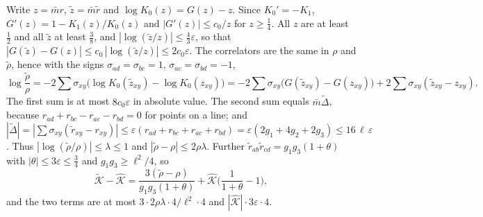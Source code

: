 \documentclass[11pt,a4paper]{article}
\makeatletter
\theoremstyle{stmt}
\theoremstyle{defn}
\theoremstyle{rmk}
\renewenvironment{proof}[1][\proofname]{\par\pushQED{\qed}\normalfont\topsep6\p@\@plus6\p@\relax
  \trivlist\item[\hskip\labelsep{\sffamily\itshape\small #1.}]\ignorespaces}{\popQED\endtrivlist\@endpefalse}
\numberwithin{equation}{section}
\makeatother
\begin{document}
{\begin{proof}
Write $z=\bar mr$, $\tilde z=\bar m\tilde r$ and $\log K_0(z)=G(z)-z$. Since $K_0'=-K_1$, $G'(z)=1-K_1(z)/K_0(z)$ and $|G'(z)|\le c_0/z$ for $z\ge\frac14$. All $z$ are at least $\frac12$ and all $\tilde z$ at least $\frac38$, and $|\log(\tilde z/z)|\le\frac43\varepsilon$, so that $|G(\tilde z)-G(z)|\le c_0\,|\log(\tilde z/z)|\le2c_0\varepsilon$. The correlators are the same in $\rho$ and $\tilde\rho$, hence with the signs $\sigma_{ad}=\sigma_{bc}=1$, $\sigma_{ac}=\sigma_{bd}=-1$,
\[
\log\frac{\tilde\rho}{\rho}=-2\sum\sigma_{xy}\big(\log K_0(\tilde z_{xy})-\log K_0(z_{xy})\big)=-2\sum\sigma_{xy}\big(G(\tilde z_{xy})-G(z_{xy})\big)+2\sum\sigma_{xy}(\tilde z_{xy}-z_{xy}).
\]
The first sum is at most $8c_0\varepsilon$ in absolute value. The second sum equals $\bar m\tilde\Delta$, because $r_{ad}+r_{bc}-r_{ac}-r_{bd}=0$ for points on a line; and $|\tilde\Delta|=|\sum\sigma_{xy}(\tilde r_{xy}-r_{xy})|\le\varepsilon(r_{ad}+r_{bc}+r_{ac}+r_{bd})=\varepsilon(2g_1+4g_2+2g_3)\le16\,\ell\,\varepsilon$. Thus $|\log(\tilde\rho/\rho)|\le\lambda\le1$ and $|\tilde\rho-\rho|\le2\rho\lambda$. Further $\tilde r_{ab}\tilde r_{cd}=g_1g_3(1+\theta)$ with $|\theta|\le3\varepsilon\le\frac34$ and $g_1g_3\ge\ell^2/4$, so
\[
\tilde{\mathcal K}-\hat{\mathcal K}=\frac{3(\tilde\rho-\rho)}{g_1g_3(1+\theta)}+\hat{\mathcal K}\Big(\frac1{1+\theta}-1\Big),
\]
and the two terms are at most $3\cdot2\rho\lambda\cdot4/\ell^2\cdot4$ and $|\hat{\mathcal K}|\cdot3\varepsilon\cdot4$.
\end{proof}
}
\end{document}
